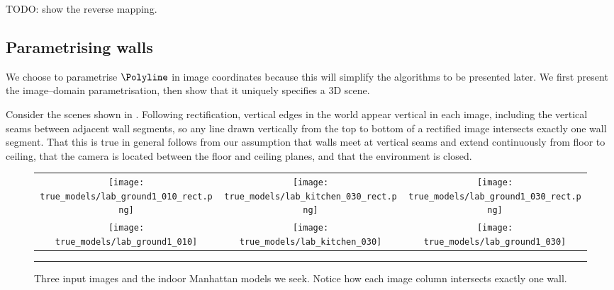 TODO: show the reverse mapping.

\subsection{Parametrising walls}

We choose to parametrise $\Polyline$ in image coordinates because this
will simplify the algorithms to be presented later. We first present
the image--domain parametrisation, then show that it uniquely
specifies a 3D scene.

Consider the scenes shown in . Following
rectification, vertical edges in the world appear vertical in each
image, including the vertical seams between adjacent wall segments, so
any line drawn vertically from the top to bottom of a rectified image
intersects exactly one wall segment. That this is true in general
follows from our assumption that walls meet at vertical seams and
extend continuously from floor to ceiling, that the camera is located
between the floor and ceiling planes, and that the environment is
closed.

\begin{figure}[tb]%
  \label{fig:example-scenes}
  \centering
    \begin{tabular}{ccc}
      \texttt{[image: true\_models/lab\_ground1\_010\_rect.png]} &
      \texttt{[image: true\_models/lab\_kitchen\_030\_rect.png]} &
      \texttt{[image: true\_models/lab\_ground1\_030\_rect.png]}
      \\      
      \texttt{[image: true\_models/lab\_ground1\_010]} &
      \texttt{[image: true\_models/lab\_kitchen\_030]} &
      \texttt{[image: true\_models/lab\_ground1\_030]}
    \end{tabular}
  \caption{Three input images and the indoor Manhattan models we
    seek. Notice how each image column intersects exactly one
    wall.}
  \hrule
\end{figure}

